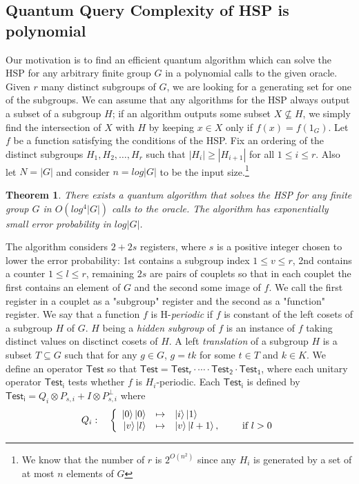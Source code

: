 \documentclass[dvips,12pt]{article}
\theoremstyle{plain}
\newtheorem{thm}{Theorem} %
\theoremstyle{definition}
\begin{document}
\subsection{Quantum Query Complexity of HSP is polynomial}
Our motivation is to find an efficient quantum algorithm which can solve the HSP for any arbitrary finite group $G$ in a polynomial calls to the given oracle. Given $r$ many distinct subgroups of $G$, we are looking for a generating set for one of the subgroups. We can assume that any algorithms for the HSP always output a subset of a subgroup $H$; if an algorithm outputs some subset $X\nsubseteq H$, we simply find the intersection of $X$ with $H$ by keeping $x\in X$ only if $f(x)=f(1_G)$.
\newline
Let $f$ be a function satisfying the conditions of the HSP. Fix an ordering of the distinct subgroups $H_1,H_2,\ldots,H_r$ such that $|H_{i}|\geq|H_{i+1}|$ for all $1\leq i \leq r$. Also let $N=|G|$ and consider $n=log|G|$ to be the input size.\footnote{We know that the number of $r$ is $2^{O(n^2)}$ since any $H_i$ is generated by a set of at most $n$ elements of $G$}
\begin{thm}\label{thm3}
There exists a quantum algorithm that solves the HSP for any finite group $G$ in $O(log^4|G|)$ calls to the oracle. The algorithm has exponentially small error probability in $log|G|$.
\end{thm}
\noindent The algorithm considers $2+2s$ registers, where $s$ is a positive integer chosen to lower the error probability: 1st contains a subgroup index $1\leq v \leq r$, 2nd contains a counter $1\leq l \leq r$, remaining $2s$ are pairs of couplets so that in each couplet the first contains an element of $G$ and the second some image of $f$. We call the first register in a couplet as a "subgroup" register and the second as a "function" register.
\newline
We say that a function $f$ is H-\emph{periodic} if $f$ is constant of the left cosets of a subgroup $H$ of $G$. $H$ being a \emph{hidden subgroup} of $f$ is an instance of $f$ taking distinct values on disctinct cosets of $H$.
\newline
A left \emph{translation} of a subgroup $H$ is a subset $T\subseteq G$ such that for any $g\in G$, $g=tk$ for some $t\in T$ and $k\in K$.
\newline
We define an operator ${\mathsf{Test}}$ so that ${\mathsf{Test}}={\mathsf{Test_r}}\cdot\cdots\cdot{\mathsf{Test_2}}\cdot{\mathsf{Test_1}}$, where each unitary operator ${\mathsf{Test_i}}$ tests whether $f$ is $H_i$-periodic. Each ${\mathsf{Test_i}}$ is defined by ${\mathsf{Test_i}}=Q_i\otimes P_{s,i}+I\otimes P^{\perp}_{s,i}$ where
$$Q_i:\quad\left\{
\begin{array}{rcl}
\ket{0}\ket{0} & \mapsto & \ket{i}\ket{1} \\
\ket{v}\ket{l} & \mapsto & \ket{v}\ket{l+1},
\qquad\text{ if $l>0$}
\end{array}
\right.
$$
\end{document}
